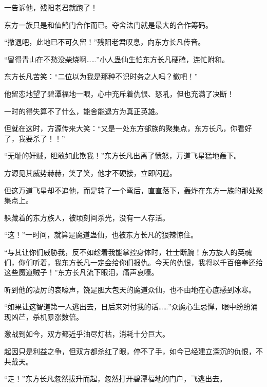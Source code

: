 \begin{this_body}
一告诉他，残阳老君就跑了！

东方一族只是和仙鹤门合作而已。夺舍法门就是最大的合作筹码。

“撤退吧，此地已不可久留！”残阳老君叹息，向东方长凡传音。

“留得青山在不愁没柴烧啊……”小人蛊仙生怕东方长凡硬磕，连忙附和。

东方长凡苦笑：“二位以为我是那种不识时务之人吗？撤吧！”

他留恋地望了碧潭福地一眼，心中充斥着仇恨、怒吼，但也充满了决断！

一时的得失算不了什么，能舍能退方为真正英雄。

但就在这时，方源传来大笑：“又是一处东方部族的聚集点，东方长凡，你看好了，我要杀了！！”

“无耻的奸贼，胆敢如此欺我！”东方长凡出离了愤怒，万道飞星猛地轰下。

方源见其威势赫赫，笑了笑，他才不硬接，立即闪避。

但这万道飞星却不追他，而是转了一个弯后，直直落下，轰炸在东方一族的那处聚集点上。

躲藏着的东方族人，被顷刻间杀光，没有一人存活。

“这！”一时间，就算是魔道蛊仙，也被东方长凡的狠辣惊住。

“与其让你们威胁我，反不如趁着我能掌控身体时，壮士断腕！东方族人的英魂们，你们听着，我东方长凡一定会给你们报仇。今天的仇恨，我将以千百倍奉还给这些魔道贼子！”东方长凡流下眼泪，痛声哀嚎。

听到他的凄厉的哀嚎声，饶是胆大包天的魔道众仙，也不由地在心底感到冰寒。

“如果让这智道第一人逃出去，日后来对付我的话……”众魔心生忌惮，眼中纷纷涌现凶芒，杀机暴涨数倍。

激战到如今，双方都近乎油尽灯枯，消耗十分巨大。

起因只是利益之争，但双方都杀红了眼，停不了手，如今已经建立深沉的仇恨，不共戴天。

“走！”东方长凡忽然拔升而起，忽然打开碧潭福地的门户，飞逃出去。

\end{this_body}

